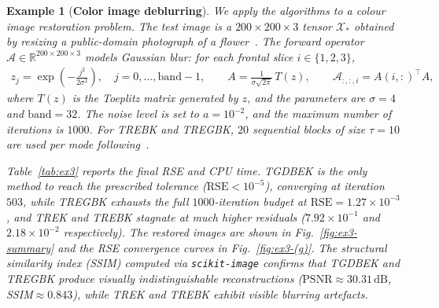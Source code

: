 \documentclass[11pt]{article}
\newtheorem{example}[theorem]{Example}
\def\fm#1{\mathcal{#1}}
\begin{document}
\begin{example}[\textbf{Color image deblurring}] \label{ex:color-image}
We apply the algorithms to a colour image restoration problem. The test image is a $200\times 200\times 3$ tensor $\fm X_\ast$ obtained by resizing a public-domain photograph of a flower~\cite{hlevkin}. The forward operator $\fm A \in \mathbb{R}^{200\times 200\times 3}$ models Gaussian blur: for each frontal slice $i\in\{1,2,3\}$,
\begin{align*}
z_j = \exp\!\left(-\frac{j^2}{2\sigma^2}\right),\quad j=0,\ldots,\mathrm{band}-1, \qquad
A = \frac{1}{\sigma\sqrt{2\pi}}\,T(z), \qquad \fm A_{:,:,i} = A(i,:)^\top A,
\end{align*}
where $T(z)$ is the Toeplitz matrix generated by $z$, and the parameters are $\sigma = 4$ and $\mathrm{band} = 32$. The noise level is set to $a = 10^{-2}$, and the maximum number of iterations is $1000$. For TREBK and TREGBK, $20$ sequential blocks of size $\tau=10$ are used per mode following~\cite{du2020rando}.

Table~\ref{tab:ex3} reports the final RSE and CPU time. TGDBEK is the only method to reach the prescribed tolerance ($\mathrm{RSE}<10^{-5}$), converging at iteration $503$, while TREGBK exhausts the full $1000$-iteration budget at $\mathrm{RSE}=1.27\times10^{-3}$, and TREK and TREBK stagnate at much higher residuals ($7.92\times10^{-1}$ and $2.18\times10^{-2}$ respectively). The restored images are shown in Fig.~\ref{fig:ex3-summary} and the RSE convergence curves in Fig.~\ref{fig:ex3-(g)}. The structural similarity index (SSIM) computed via \texttt{scikit-image} confirms that TGDBEK and TREGBK produce visually indistinguishable reconstructions ($\mathrm{PSNR}\approx30.31\,\mathrm{dB}$, SSIM$\approx0.843$), while TREK and TREBK exhibit visible blurring artefacts.
\end{example}
\end{document}
